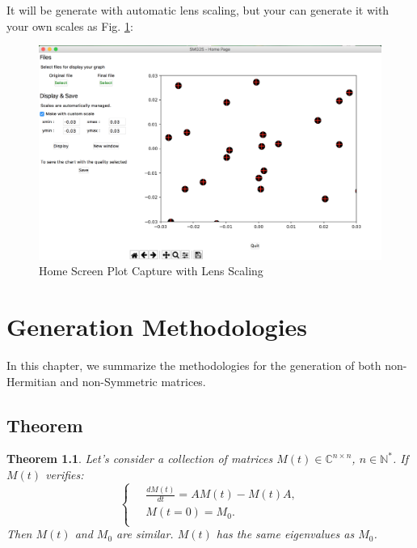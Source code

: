 \documentclass[a4paper, 10 pt]{report}
\newtheorem{theorem}{Theorem}
\begin{document}
It will be generate with automatic lens scaling, but your can generate it with your own scales as Fig. \ref{fig:Home Screen Plot Capture with lens scaling}:

\begin{figure}[htbp]
	\label{fig:Home Screen Plot Capture with lens scaling}
	\caption{Home Screen Plot Capture with Lens Scaling}
		\centering
	\includegraphics[width=12cm]{home_screen_custom.png}
\end{figure}

	\newpage
	
	\chapter{Generation Methodologies}
	
	In this chapter, we summarize the methodologies for the generation of both non-Hermitian and non-Symmetric matrices.
	
	\section{Theorem} \label{Matrix_Generation_Method}
	
	\begin{theorem}
		\label{theo1}
		Let's consider a collection of matrices $M(t) \in \mathbb{C}^{n \times n}$, $n \in \mathbb{N}^*$. If $M(t)$ verifies: 
		\[
		\left\{\
		\begin{aligned}
		&\frac{dM(t)}{dt} = AM(t) - M(t)A, \\
		&M(t=0) = M_0. \\ 
		\end{aligned}
		\right.
		\]
		Then $M(t)$ and $M_0$ are similar. $M(t)$ has the same eigenvalues as $M_0$.
	\end{theorem}
	
\end{document}
